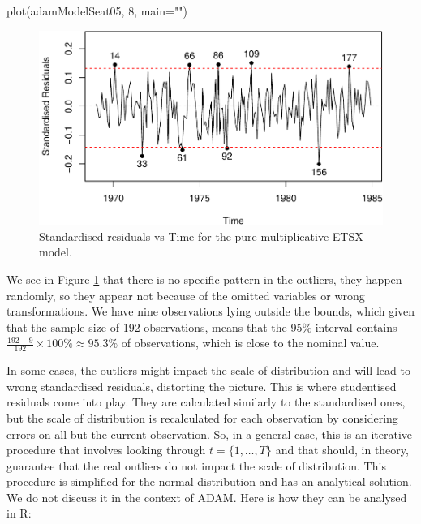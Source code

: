 \documentclass[
]{book}
\newenvironment{Shaded}{\begin{snugshade}}{\end{snugshade}}
\newcommand{\AttributeTok}[1]{\textcolor[rgb]{0.77,0.63,0.00}{#1}}
\newcommand{\DecValTok}[1]{\textcolor[rgb]{0.00,0.00,0.81}{#1}}
\newcommand{\FunctionTok}[1]{\textcolor[rgb]{0.00,0.00,0.00}{#1}}
\newcommand{\NormalTok}[1]{#1}
\newcommand{\StringTok}[1]{\textcolor[rgb]{0.31,0.60,0.02}{#1}}
\theoremstyle{definition}
\theoremstyle{definition}
\theoremstyle{definition}
\theoremstyle{definition}
\theoremstyle{remark}
\begin{document}
\begin{Shaded}
\begin{Highlighting}[]
\FunctionTok{plot}\NormalTok{(adamModelSeat05, }\DecValTok{8}\NormalTok{, }\AttributeTok{main=}\StringTok{""}\NormalTok{)}
\end{Highlighting}
\end{Shaded}

\begin{figure}
\centering
\includegraphics{Svetunkov--2022----ADAM_files/figure-latex/adamModelSeat05ResidTime-1.pdf}
\caption{\label{fig:adamModelSeat05ResidTime}Standardised residuals vs Time for the pure multiplicative ETSX model.}
\end{figure}

We see in Figure \ref{fig:adamModelSeat05ResidTime} that there is no specific pattern in the outliers, they happen randomly, so they appear not because of the omitted variables or wrong transformations. We have nine observations lying outside the bounds, which given that the sample size of 192 observations, means that the 95\% interval contains \(\frac{192-9}{192} \times 100 \% \approx 95.3 \%\) of observations, which is close to the nominal value.

In some cases, the outliers might impact the scale of distribution and will lead to wrong standardised residuals, distorting the picture. This is where studentised residuals come into play. They are calculated similarly to the standardised ones, but the scale of distribution is recalculated for each observation by considering errors on all but the current observation. So, in a general case, this is an iterative procedure that involves looking through \(t=\{1,\dots,T\}\) and that should, in theory, guarantee that the real outliers do not impact the scale of distribution. This procedure is simplified for the normal distribution and has an analytical solution. We do not discuss it in the context of ADAM. Here is how they can be analysed in R:
\end{document}
